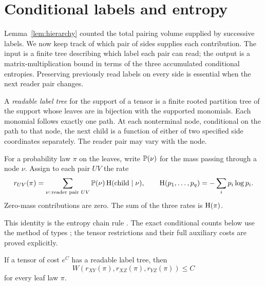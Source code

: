 \section{Conditional labels and entropy}\label{sec:trees}

Lemma~\ref{lem:hierarchy} counted the total pairing volume supplied by
successive labels.  We now keep track of which pair of sides supplies
each contribution.  The input is a finite tree describing which label
each pair can read; the output is a matrix-multiplication bound in
terms of the three accumulated conditional entropies.  Preserving
previously read labels on every side is essential when the next
reader pair changes.

\begin{definition}\label{def:label-tree}
A \emph{readable label tree} for the support of a tensor is a finite
rooted partition tree of the support whose leaves are in bijection
with the supported monomials.  Each monomial follows exactly one path.
At each nonterminal node, conditional on the path to that node, the
next child is a function of either of two specified side coordinates
separately.
The reader pair may vary with the node.
\end{definition}

For a probability law \(\pi\) on the leaves, write \(\mathbb P(\nu)\) for
the mass passing through a node \(\nu\).
Assign to each pair \(UV\) the rate
\[
 r_{UV}(\pi)=
 \sum_{\nu:\,\text{reader pair }UV}
 \mathbb P(\nu)\,\mathrm H(\text{child}\mid\nu),
 \qquad
 \mathrm H(p_1,\ldots,p_q)=-\sum_i p_i\log p_i.
\]
Zero-mass contributions are zero.
The sum of the three rates is \(\mathrm H(\pi)\).

This identity is the entropy chain rule \cite[Section~6]{shannon1948}.
The exact conditional counts below use the method of types
\cite[Section~II]{csiszar1998}; the tensor restrictions and their full
auxiliary costs are proved explicitly.

\begin{theorem}\label{thm:entropy}
If a tensor of cost \(e^C\) has a readable label tree, then
\begin{equation}\label{eq:entropy-bound}
 W(r_{XY}(\pi),r_{XZ}(\pi),r_{YZ}(\pi))\le C
\end{equation}
for every leaf law \(\pi\).
\end{theorem}

